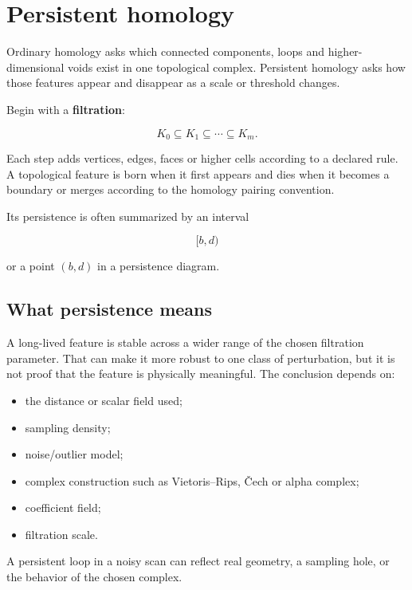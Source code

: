 \hypertarget{appendix-e4d8ed8d6787}{}
\section{Persistent homology}\label{appendix-e4d8ed8d6787-persistent-homology}

Ordinary homology asks which connected components, loops and higher-dimensional voids exist in one topological complex. Persistent homology asks how those features appear and disappear as a scale or threshold changes.

Begin with a \textbf{filtration}:

\[
K_0\subseteq K_1\subseteq\cdots\subseteq K_m.
\]

Each step adds vertices, edges, faces or higher cells according to a declared rule. A topological feature is born when it first appears and dies when it becomes a boundary or merges according to the homology pairing convention.

Its persistence is often summarized by an interval

\[
[b,d)
\]

or a point \((b,d)\) in a persistence diagram.

\subsection{What persistence means}\label{appendix-e4d8ed8d6787-what-persistence-means}

A long-lived feature is stable across a wider range of the chosen filtration parameter. That can make it more robust to one class of perturbation, but it is not proof that the feature is physically meaningful. The conclusion depends on:

\begin{itemize}
\tightlist
\item
  the distance or scalar field used;
\item
  sampling density;
\item
  noise/outlier model;
\item
  complex construction such as Vietoris--Rips, Čech or alpha complex;
\item
  coefficient field;
\item
  filtration scale.
\end{itemize}

A persistent loop in a noisy scan can reflect real geometry, a sampling hole, or the behavior of the chosen complex.

